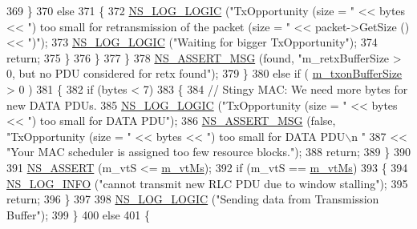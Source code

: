 \begin{DoxyCode}
369                 \}
370               \textcolor{keywordflow}{else}
371                 \{
372                   \hyperlink{group__logging_ga88acd260151caf2db9c0fc84997f45ce}{NS\_LOG\_LOGIC} (\textcolor{stringliteral}{"TxOpportunity (size = "} << bytes << \textcolor{stringliteral}{") too small for
       retransmission of the packet (size = "} << packet->GetSize () << \textcolor{stringliteral}{")"});
373                   \hyperlink{group__logging_ga88acd260151caf2db9c0fc84997f45ce}{NS\_LOG\_LOGIC} (\textcolor{stringliteral}{"Waiting for bigger TxOpportunity"});
374                   \textcolor{keywordflow}{return};
375                 \}
376             \}
377         \}
378       \hyperlink{assert_8h_aff5ece9066c74e681e74999856f08539}{NS\_ASSERT\_MSG} (found, \textcolor{stringliteral}{"m\_retxBufferSize > 0, but no PDU considered for retx found"});
379     \}
380   \textcolor{keywordflow}{else} \textcolor{keywordflow}{if} ( \hyperlink{classns3_1_1LteRlcAm_a3e8db6b5bc1d3fcc215d554e8d347eda}{m\_txonBufferSize} > 0 )
381     \{
382       \textcolor{keywordflow}{if} (bytes < 7)
383       \{
384         \textcolor{comment}{// Stingy MAC: We need more bytes for new DATA PDUs.}
385         \hyperlink{group__logging_ga88acd260151caf2db9c0fc84997f45ce}{NS\_LOG\_LOGIC} (\textcolor{stringliteral}{"TxOpportunity (size = "} << bytes << \textcolor{stringliteral}{") too small for DATA PDU"});
386         \hyperlink{assert_8h_aff5ece9066c74e681e74999856f08539}{NS\_ASSERT\_MSG} (\textcolor{keyword}{false}, \textcolor{stringliteral}{"TxOpportunity (size = "} << bytes << \textcolor{stringliteral}{") too small for DATA PDU\(\backslash\)n
      "}
387                            << \textcolor{stringliteral}{"Your MAC scheduler is assigned too few resource blocks."});
388         \textcolor{keywordflow}{return};
389       \}
390 
391       \hyperlink{assert_8h_a6dccdb0de9b252f60088ce281c49d052}{NS\_ASSERT} (m\_vtS <= \hyperlink{classns3_1_1LteRlcAm_a5fcf0776ed7e13952945d41e4b3622c7}{m\_vtMs});
392       \textcolor{keywordflow}{if} (m\_vtS == \hyperlink{classns3_1_1LteRlcAm_a5fcf0776ed7e13952945d41e4b3622c7}{m\_vtMs})
393         \{
394           \hyperlink{group__logging_gafbd73ee2cf9f26b319f49086d8e860fb}{NS\_LOG\_INFO} (\textcolor{stringliteral}{"cannot transmit new RLC PDU due to window stalling"});
395           \textcolor{keywordflow}{return};
396         \}
397 
398       \hyperlink{group__logging_ga88acd260151caf2db9c0fc84997f45ce}{NS\_LOG\_LOGIC} (\textcolor{stringliteral}{"Sending data from Transmission Buffer"});
399     \}
400   \textcolor{keywordflow}{else}
401     \{

\end{DoxyCode}
